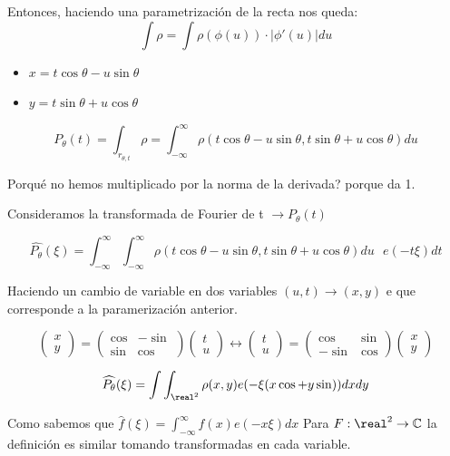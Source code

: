 	Entonces, haciendo una parametrización de la recta nos queda:
	$$\int \rho = \int \rho (\phi(u)) \cdot |\phi '(u)| du$$
	\begin{itemize}
		\item $x = t\cos\theta - u \sin\theta$
		\item $y = t\sin\theta + u \cos\theta$
	\end{itemize}

	$$P_{\theta} (t) = \int_{r_{\theta , t}} \rho = \int_{-\infty}^{\infty} \rho ( t\cos\theta - u\sin\theta , t\sin\theta + u\cos\theta) du$$

	Porqué no hemos multiplicado por la norma de la derivada? porque da 1.

	Consideramos la transformada de Fourier de t $\rightarrow P_{\theta}(t)$

	$$\widehat{P_{\theta}}(\xi) = \int_{-\infty}^{\infty} \int_{-\infty}^{\infty} \rho ( t\cos\theta - u\sin\theta , t\sin\theta + u\cos\theta) du\text{  }e(-t\xi) dt $$

	Haciendo un cambio de variable en dos variables $(u,t) \rightarrow (x,y)$ e que corresponde a la paramerización anterior.

	$$\left(\begin{matrix}
		x\\
		y
	\end{matrix} \right) = \left( \begin{matrix}
	\cos & -\sin\\
	\sin & \cos
	\end{matrix}\right)\left(\begin{matrix}
	t\\
	u
	\end{matrix}\right) \longleftrightarrow \left(\begin{matrix}
	t\\
	u
	\end{matrix} \right) = \left( \begin{matrix}
	\cos & \sin\\
	-\sin & \cos
	\end{matrix}\right)\left(\begin{matrix}
	x\\
	y
	\end{matrix}\right)$$

	$$\widehat{P_{\theta}}(\xi) = \int\int_{\real^2} \rho(x,y) e(-\xi(x\cos + y\sin)) dxdy$$

	\obs Como sabemos que $\widehat{f}(\xi) = \int_{-\infty}^{\infty} f(x) e(-x\xi)dx$ Para $F : \real^2 \rightarrow \mathbb{C}$ la definición es similar tomando transformadas en cada variable.

